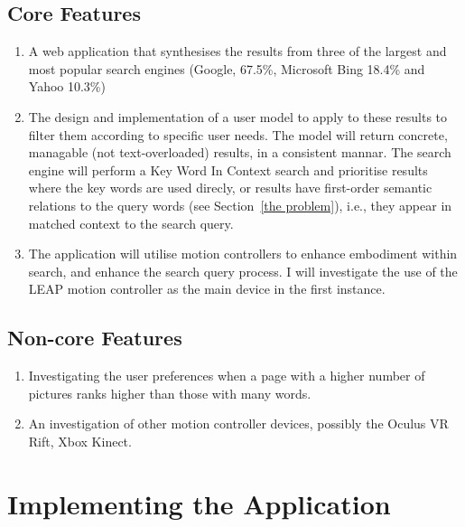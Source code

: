 \documentclass[10pt]{article}
\begin{document}
\subsection{Core Features}
\begin{enumerate}
\item  A web application that synthesises the results from three of the largest and most popular search engines (Google, 67.5\%, Microsoft Bing 18.4\% and Yahoo 10.3\%) \cite{adam}

\item The design and implementation of a user model to apply to these results to filter them according to specific user needs. The model will return concrete, managable (not text-overloaded) results, in a consistent mannar. The search engine will perform a Key Word In Context search and prioritise results where the key words are used direcly, or results have first-order semantic relations to the query words (see Section~\ref{the problem}), i.e., they appear in matched context to the search query.

\item The application will utilise motion controllers to enhance embodiment within search, and enhance the search query process. I will investigate the use of the LEAP motion controller as the main device in the first instance.
\end{enumerate}

\subsection{Non-core Features}
\begin{enumerate}

\item Investigating the user preferences when a page with a higher number of pictures ranks higher than those with many words. 

\item An investigation of other motion controller devices, possibly the Oculus VR Rift, Xbox Kinect.

\end{enumerate}

\section{Implementing the Application}\label{api}
\end{document}
